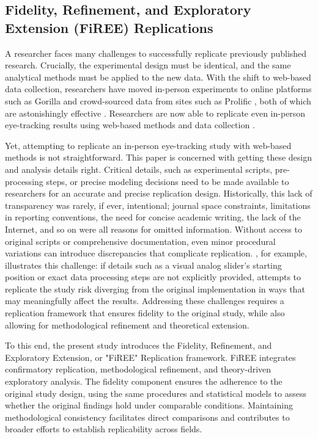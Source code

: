 \subsection{Fidelity, Refinement, and Exploratory Extension (FiREE) Replications}

A researcher faces many challenges to successfully replicate previously published research. Crucially, the experimental design must be identical, and the same analytical methods must be applied to the new data. With the shift to web-based data collection, researchers have moved in-person experiments to online platforms such as Gorilla \citep{Anwyl-Irvine_2019} and crowd-sourced data from sites such as Prolific \citep{douglas2023data}, both of which are astonishingly effective \citep{tomczak2023over, eerola2021online}. Researchers are now able to replicate even in-person eye-tracking results using web-based methods and data collection \citep[see ][] {semmelmann2018online, Vos_2022, Prystauka_Altmann_Rothman_2023}. 

Yet, attempting to replicate an in-person eye-tracking study with web-based methods is not straightforward. This paper is concerned with getting these design and analysis details right. Critical details, such as experimental scripts, pre-processing steps, or precise modeling decisions need to be made available to researchers for an accurate and precise replication design. Historically, this lack of transparency was rarely, if ever, intentional; journal space constraints, limitations in reporting conventions, the need for concise academic writing, the lack of the Internet, and so on were all reasons for omitted information. Without access to original scripts or comprehensive documentation, even minor procedural variations can introduce discrepancies that complicate replication. \cite{AOW}, for example, illustrates this challenge: if details such as a visual analog slider's starting position or exact data processing steps are not explicitly provided, attempts to replicate the study risk diverging from the original implementation in ways that may meaningfully affect the results. Addressing these challenges requires a replication framework that ensures fidelity to the original study, while also allowing for methodological refinement and theoretical extension.

To this end, the present study introduces the Fidelity, Refinement, and Exploratory Extension, or "FiREE" Replication framework. FiREE integrates confirmatory replication, methodological refinement, and theory-driven exploratory analysis. The fidelity component ensures the adherence to the original study design, using the same procedures and statistical models to assess whether the original findings hold under comparable conditions. Maintaining methodological consistency facilitates direct comparisons and contributes to broader efforts to establish replicability across fields. 

